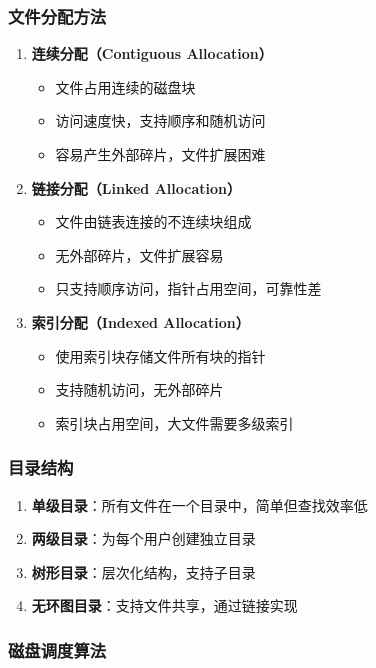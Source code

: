 \subsubsection{文件分配方法}

\begin{enumerate}
  \item \textbf{连续分配（Contiguous Allocation）}
    \begin{itemize}
      \item 文件占用连续的磁盘块
      \item 访问速度快，支持顺序和随机访问
      \item 容易产生外部碎片，文件扩展困难
    \end{itemize}

  \item \textbf{链接分配（Linked Allocation）}
    \begin{itemize}
      \item 文件由链表连接的不连续块组成
      \item 无外部碎片，文件扩展容易
      \item 只支持顺序访问，指针占用空间，可靠性差
    \end{itemize}

  \item \textbf{索引分配（Indexed Allocation）}
    \begin{itemize}
      \item 使用索引块存储文件所有块的指针
      \item 支持随机访问，无外部碎片
      \item 索引块占用空间，大文件需要多级索引
    \end{itemize}
\end{enumerate}

\subsubsection{目录结构}

\begin{enumerate}
  \item \textbf{单级目录}：所有文件在一个目录中，简单但查找效率低
  \item \textbf{两级目录}：为每个用户创建独立目录
  \item \textbf{树形目录}：层次化结构，支持子目录
  \item \textbf{无环图目录}：支持文件共享，通过链接实现
\end{enumerate}

\subsubsection{磁盘调度算法}

